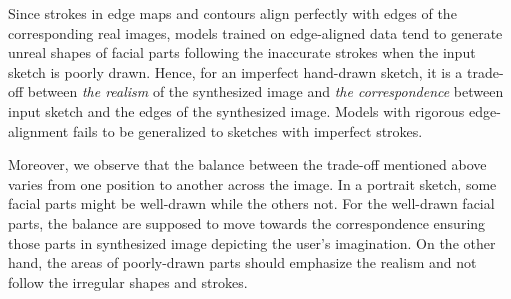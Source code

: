 Since strokes in edge maps and contours align perfectly with edges of the corresponding real images, models trained on edge-aligned data tend to generate unreal shapes of facial parts following the inaccurate strokes when the input sketch is poorly drawn. Hence, for an imperfect hand-drawn sketch, it is a trade-off between \textit{the realism} of the synthesized image and \textit{the correspondence} between input sketch and the edges of the synthesized image.
Models with rigorous edge-alignment fails to be generalized to sketches with imperfect strokes.

Moreover, we observe that the balance between the trade-off mentioned above varies from one position to another across the image. In a portrait sketch, some facial parts might be well-drawn while the others not. For the well-drawn facial parts, the balance are supposed to move towards the correspondence ensuring those parts in synthesized image depicting the user's imagination. On the other hand, the areas of poorly-drawn parts should emphasize the realism and not follow the irregular shapes and strokes.

